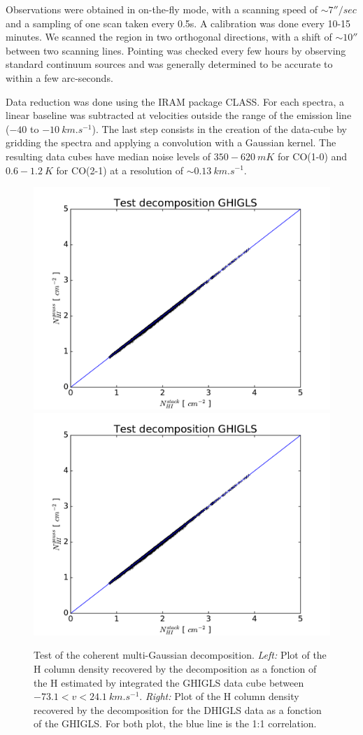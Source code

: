 \documentclass[traditabstract]{aa}
\begin{document}
   Observations were obtained in on-the-fly mode, with a scanning speed of $\sim 7''/sec$ and a sampling of one scan taken every 0.5s. A calibration was done every 10-15 minutes. We scanned the region in two orthogonal directions, with a shift of $\sim 10''$ between two scanning lines. Pointing was checked every few hours by observing standard continuum sources and was generally determined to be accurate to within a few arc-seconds.

Data reduction was done using the IRAM package CLASS. For each spectra, a linear baseline was subtracted at velocities outside the range of the emission line ($-40$ to $-10\: km.s^{-1}$). The last step consists in the creation of the data-cube by gridding the spectra and applying a convolution with a Gaussian kernel. The resulting data cubes have median noise levels of $350-620\: mK$ for CO(1-0) and $0.6-1.2\: K$ for CO(2-1) at a resolution of $\sim 0.13\: km.s^{-1}$.

\begin{figure}
  \includegraphics[page=1,width=0.49\linewidth]{Figures/Test_decomposition.pdf}
  \includegraphics[page=3,width=0.49\linewidth]{Figures/Test_decomposition.pdf}
  \caption{\label{Test} Test of the coherent multi-Gaussian decomposition. \emph{Left:} Plot of the H column density recovered by the decomposition as a fonction of the H estimated by integrated the GHIGLS data cube between $-73.1<v<24.1\: km.s^{-1}$. \emph{Right:} Plot of the H column density recovered by the decomposition for the DHIGLS data as a fonction of the GHIGLS. For both plot, the blue line is the 1:1 correlation.}
\end{figure}
\end{document}
